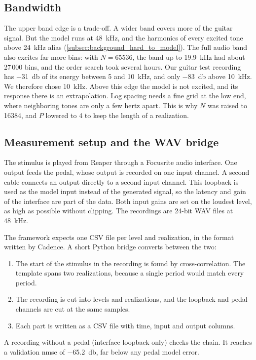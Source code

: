 \subsection{Bandwidth}
\label{subsec:bandwidth}

The upper band edge is a trade-off. A wider band covers more of the guitar signal. But the model runs at \SI{48}{\kilo\hertz}, and the harmonics of every excited tone above \SI{24}{\kilo\hertz} alias (\cref{subsec:background_hard_to_model}). The full audio band also excites far more bins: with $N = 65536$, the band up to \SI{19.9}{\kilo\hertz} had about 27\,000 bins, and the order search took several hours. Our guitar test recording has \SI{-31}{\decibel} of its energy between 5 and \SI{10}{\kilo\hertz}, and only \SI{-83}{\decibel} above \SI{10}{\kilo\hertz}. We therefore chose \SI{10}{\kilo\hertz}. Above this edge the model is not excited, and its response there is an extrapolation. Log spacing needs a fine grid at the low end, where neighboring tones are only a few hertz apart. This is why $N$ was raised to 16384, and $P$ lowered to 4 to keep the length of a realization.

\subsection{Measurement setup and the WAV bridge}
\label{subsec:impl_measurement}

The stimulus is played from Reaper through a Focusrite  audio interface. One output feeds the pedal, whose output is recorded on one input channel. A second cable connects an output directly to a second input channel. This loopback is used as the model input instead of the generated signal, so the latency and gain of the interface are part of the data. Both input gains are set on the loudest level, as high as possible without clipping. The recordings are 24-bit WAV files at \SI{48}{\kilo\hertz}.

The framework expects one CSV file per level and realization, in the format written by Cadence. A short Python bridge converts between the two:
\begin{enumerate}
  \item The start of the stimulus in the recording is found by cross-correlation. The template spans two realizations, because a single period would match every period.
  \item The recording is cut into levels and realizations, and the loopback and pedal channels are cut at the same samples.
  \item Each part is written as a CSV file with time, input and output columns.
\end{enumerate}
A recording without a pedal (interface loopback only) checks the chain. It reaches a validation \gls{nmse} of \SI{-65.2}{\decibel}, far below any pedal model error.


